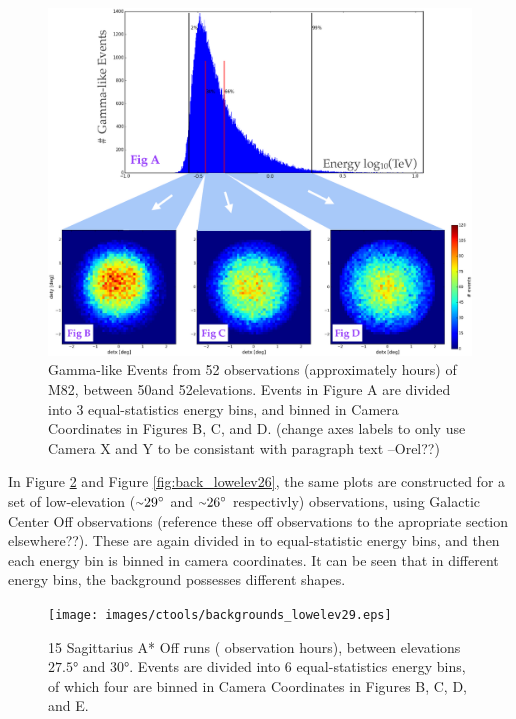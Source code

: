     \begin{figure}[ht]
      \begin{center}
        \includegraphics[width=\textwidth]{images/ctools/backgrounds_highelev.eps}
        \caption[FITS Background at 50\degree Elevation]{Gamma-like Events from 52 observations (approximately  hours) of M82, between 50\degree  and 52\degree  elevations.  Events in Figure A are divided into 3 equal-statistics energy bins, and binned in Camera Coordinates in Figures B, C, and D. (change axes labels to only use Camera X and Y to be consistant with paragraph text --Orel??)}\label{fig:back_highelev}
      \end{center}
    \end{figure}

    In Figure \ref{fig:back_lowelev29} and Figure \ref{fig:back_lowelev26}, the same plots are constructed for a set of low-elevation ($ \nicetilde \ang{29} $ and $ \nicetilde \ang{26} $ respectivly) observations, using Galactic Center Off observations (reference these off observations to the apropriate section elsewhere??).
    These are again divided in to equal-statistic energy bins, and then each energy bin is binned in camera coordinates.
    It can be seen that in different energy bins, the background possesses different shapes.

    \begin{figure}[ht]
      \begin{center}
        \texttt{[image: images/ctools/backgrounds\_lowelev29.eps]}
        \caption[CTOOLS Background at 29\degree Elevation]{15 Sagittarius A* Off runs ( observation hours), between elevations $ \ang{27.5} $ and $ \ang{30} $.  Events are divided into 6 equal-statistics energy bins, of which four are binned in Camera Coordinates in Figures B, C, D, and E.}\label{fig:back_lowelev29}
      \end{center}
    \end{figure}

